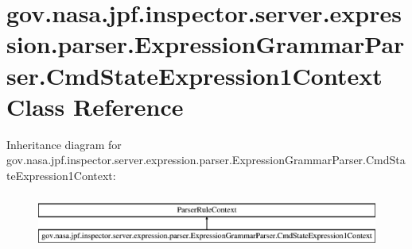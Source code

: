 \hypertarget{classgov_1_1nasa_1_1jpf_1_1inspector_1_1server_1_1expression_1_1parser_1_1_expression_grammar_pa1eb341e049a8047f26aa8b84266a8b94}{}\section{gov.\+nasa.\+jpf.\+inspector.\+server.\+expression.\+parser.\+Expression\+Grammar\+Parser.\+Cmd\+State\+Expression1\+Context Class Reference}
\label{classgov_1_1nasa_1_1jpf_1_1inspector_1_1server_1_1expression_1_1parser_1_1_expression_grammar_pa1eb341e049a8047f26aa8b84266a8b94}
Inheritance diagram for gov.\+nasa.\+jpf.\+inspector.\+server.\+expression.\+parser.\+Expression\+Grammar\+Parser.\+Cmd\+State\+Expression1\+Context\+:\begin{figure}[H]
\begin{center}
\leavevmode
\includegraphics[height=1.818182cm]{classgov_1_1nasa_1_1jpf_1_1inspector_1_1server_1_1expression_1_1parser_1_1_expression_grammar_pa1eb341e049a8047f26aa8b84266a8b94}
\end{center}
\end{figure}
